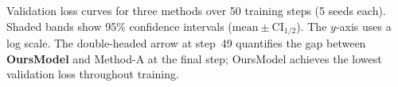 \caption{Validation loss curves for three methods over 50 training steps (5 seeds each). Shaded bands show 95\% confidence intervals ($\text{mean} \pm \text{CI}_{1/2}$). The $y$-axis uses a log scale. The double-headed arrow at step~49 quantifies the gap between \textbf{OursModel} and Method-A at the final step; OursModel achieves the lowest validation loss throughout training.}
